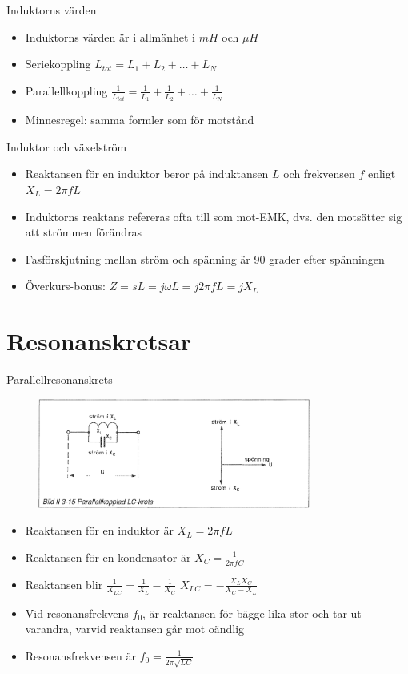 \documentclass{beamer}
\begin{document}
\begin{frame}{Induktorns värden}
  \begin{itemize}
    \item Induktorns värden är i allmänhet i $mH$ och $\mu H$
    \item Seriekoppling $L_{tot} = L_1 + L_2 + \ldots + L_N$
    \item Parallellkoppling $\frac{1}{L_{tot}} = \frac{1}{L_1} + \frac{1}{L_2} + \ldots + \frac{1}{L_N}$
    \item Minnesregel: samma formler som för motstånd
  \end{itemize}
\end{frame}

\begin{frame}{Induktor och växelström}
  \begin{itemize}
  \item Reaktansen för en induktor beror på induktansen $L$ och frekvensen $f$ enligt $X_L = 2\pi f L$
  \item Induktorns reaktans refereras ofta till som mot-EMK, dvs. den motsätter sig att strömmen förändras
  \item Fasförskjutning mellan ström och spänning är 90 grader efter spänningen
  \item Överkurs-bonus: $Z = sL = j\omega L = j2\pi f L = jX_L$
  \end{itemize}
\end{frame}

\section{Resonanskretsar}

\begin{frame}{Parallellresonanskrets}

\begin{figure}[h]
\includegraphics[width=0.8\textwidth]{images/bild_2_3-15}
\end{figure}

\begin{itemize}
  \item Reaktansen för en induktor är $X_L = 2\pi f L$
  \item Reaktansen för en kondensator är $X_C = \frac{1}{2\pi f C}$
  \item Reaktansen blir $\frac{1}{X_{LC}} = \frac{1}{X_L} - \frac{1}{X_C}$ $X_{LC}=-\frac{X_LX_C}{X_C-X_L}$
  \item Vid resonansfrekvens $f_0$, är reaktansen för bägge lika stor och tar ut varandra, varvid reaktansen går mot oändlig
  \item Resonansfrekvensen är $f_0 = \frac{1}{2\pi\sqrt{LC}}$
  \end{itemize}
\end{frame}
\end{document}
